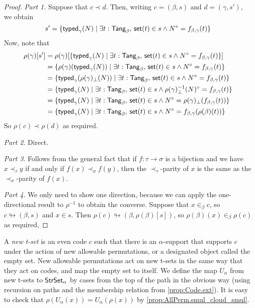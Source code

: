 \begin{proof}
  \emph{Part 1.}
  Suppose that \( c \prec d \).
  Then, writing \( c = (\beta, s) \) and \( d = (\gamma, s') \), we obtain
  \[ s' = \{ \operatorname{\mathsf{typed}}_\gamma(N) \mid \exists t : \mathsf{Tang}_\beta,\, \operatorname{\mathsf{set}}(t) \in s \wedge N^\circ = f_{\beta,\gamma}(t) \} \]
  Now, note that
  \begin{align*}
    \rho(\gamma)[s']
    &= \rho(\gamma)[\{ \operatorname{\mathsf{typed}}_\gamma(N) \mid \exists t : \mathsf{Tang}_\beta,\, \operatorname{\mathsf{set}}(t) \in s \wedge N^\circ = f_{\beta,\gamma}(t) \}] \\
    &= \{ \rho(\gamma)(\operatorname{\mathsf{typed}}_\gamma(N)) \mid \exists t : \mathsf{Tang}_\beta,\, \operatorname{\mathsf{set}}(t) \in s \wedge N^\circ = f_{\beta,\gamma}(t) \} \\
    &= \{ \operatorname{\mathsf{typed}}_\gamma(\rho(\gamma)_\bot(N)) \mid \exists t : \mathsf{Tang}_\beta,\, \operatorname{\mathsf{set}}(t) \in s \wedge N^\circ = f_{\beta,\gamma}(t) \} \\
    &= \{ \operatorname{\mathsf{typed}}_\gamma(N) \mid \exists t : \mathsf{Tang}_\beta,\, \operatorname{\mathsf{set}}(t) \in s \wedge \rho(\gamma)_\bot^{-1}(N)^\circ = f_{\beta,\gamma}(t) \} \\
    &= \{ \operatorname{\mathsf{typed}}_\gamma(N) \mid \exists t : \mathsf{Tang}_\beta,\, \operatorname{\mathsf{set}}(t) \in s \wedge N^\circ = \rho(\gamma)_\bot(f_{\beta,\gamma}(t)) \} \\
    &= \{ \operatorname{\mathsf{typed}}_\gamma(N) \mid \exists t : \mathsf{Tang}_\beta,\, \operatorname{\mathsf{set}}(t) \in s \wedge N^\circ = f_{\beta,\gamma}(\rho(\beta)(t)) \}
  \end{align*}
  So \( \rho(c) \prec \rho(d) \) as required.

  \emph{Part 2.}
  Direct.

  \emph{Part 3.}
  Follows from the general fact that if \( f : \tau \to \sigma \) is a bijection and we have \( x \prec_\tau y \) if and only if \( f(x) \prec_\sigma f(y) \), then the \( \prec_\tau \)-parity of \( x \) is the same as the \( \prec_\sigma \)-parity of \( f(x) \).

  \emph{Part 4.}
  We only need to show one direction, because we can apply the one-directional result to \( \rho^{-1} \) to obtain the converse.
  Suppose that \( x \in_\beta c \), so \( c \looparrowright (\beta, s) \) and \( x \in s \).
  Then \( \rho(c) \looparrowright (\beta, \rho(\beta)[s]) \), so \( \rho(\beta)(x) \in_\beta \rho(c) \) as required,
\end{proof}
\begin{definition}
  \label{def:NewTSet}
  A \emph{new t-set} is an even code \( c \) such that there is an \( \alpha \)-support that supports \( c \) under the action of new allowable permutations, or a designated object called the empty set.
  New allowable permutations act on new t-sets in the same way that they act on codes, and map the empty set to itself.
  We define the map \( U_\alpha \) from new t-sets to \( \mathsf{StrSet}_\alpha \) by cases from the top of the path in the obvious way (using recursion on paths and the membership relation from \cref{prop:Code.ext}).
  It is easy to check that \( \rho(U_\alpha(x)) = U_\alpha(\rho(x)) \) by \cref{prop:AllPerm.smul_cloud_smul}.
\end{definition}
